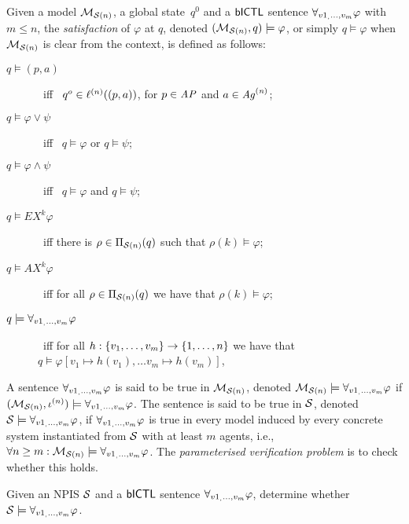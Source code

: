 \begin{definition}[Satisfaction]
  \label{def:sat} 
  Given a model $\mathcal{M}_{\mathcal{S}(n)}$, a global state~$q^0$ and a $\sf{bICTL}$ sentence
  $\forall_{v1_,\ldots,v_m} \varphi$ with $m \leq n$, the \emph{satisfaction} of $\varphi$ at $q$, denoted $(\mathcal{M}_{\mathcal{S}(n)}, q)
  \models\varphi$, or simply $q \models \varphi$ when $\mathcal{M}_{\mathcal{S}(n)}$ is clear from
  the context, is defined as follows:
  \begin{description}
  \item[$q \models (p, a)$] \ iff \ $q^o \in \ell^{(n)}((p, a))$, for $p \in
  \it{AP}$ and $a \in \it{Ag}^{(n)}$; 
  \item[$q \models \varphi \lor \psi$] \ iff \ $q \models \varphi$ or $q \models
  \psi$;
  \item[$q \models \varphi \land \psi$] \ iff \ $q \models \varphi$ and $q
  \models \psi$;
  \item[$q \models EX^k  \varphi$] \ iff  there is $\rho \in \Pi_{\mathcal{S}(n)}(q)$ such
  that $\rho(k) \models \varphi$;
  \item[$q \models AX^k  \varphi$] \ iff for all $\rho \in \Pi_{\mathcal{S}(n)}(q)$ we
  have that $\rho(k) \models \varphi$;
  \item[$q \models \forall_{v1_,\ldots,v_m} \varphi$] \ iff for all $h : \left \{ v_1, \ldots, v_m \right \}
  \rightarrow \left \{ {1}, \ldots,{n} \right \}$ we have that $q \models 
  \varphi[v_1 \mapsto h(v_1), \ldots v_m \mapsto h(v_m)]$,
 \end{description}
\end{definition}

A sentence $\forall_{v1_,\ldots,v_m} \varphi$ is said to be true in $\mathcal{M}_{\mathcal{S}(n)}$, denoted $\mathcal{M}_{\mathcal{S}(n)}
\models \forall_{v1_,\ldots,v_m} \varphi$ if $(\mathcal{M}_{\mathcal{S}(n)}, \iota^{({n})}) \models \forall_{v1_,\ldots,v_m} \varphi$. The
sentence is said to be true in $\mathcal{S}$, denoted $\mathcal{S} \models \forall_{v1_,\ldots,v_m} \varphi$, if
$\forall_{v1_,\ldots,v_m} \varphi$ is true in every model induced by every concrete system
instantiated from $\mathcal{S}$ with at least $m$ agents, i.e., $\forall n \geq m :
\mathcal{M}_{\mathcal{S}(n)} \models \forall_{v1_,\ldots,v_m} \varphi$.  The {\em parameterised verification problem} is to
check whether this holds.


\begin{definition}
  Given an NPIS $\mathcal{S}$ and a $\sf{bICTL}$ sentence $\forall_{v1_,\ldots,v_m} \varphi$, determine whether
  $\mathcal{S} \models \forall_{v1_,\ldots,v_m} \varphi$.
\end{definition}

  

